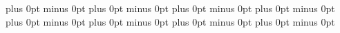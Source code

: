\ITBLayoutChapterTitleAbove=-36pt plus 0pt minus 0pt
\ITBLayoutChapterTitleBelow=18pt plus 0pt minus 0pt
\ITBLayoutSectionTitleAbove=18pt plus 0pt minus 0pt
\ITBLayoutSectionTitleBelow=6pt plus 0pt minus 0pt
\ITBLayoutSubsectionTitleAbove=14pt plus 0pt minus 0pt
\ITBLayoutSubsectionTitleBelow=4pt plus 0pt minus 0pt
\ITBLayoutSubsubsectionTitleAbove=12pt plus 0pt minus 0pt
\ITBLayoutSubsubsectionTitleBelow=4pt plus 0pt minus 0pt

\newcommand{\ITBLayoutCftBeforeChapSkip}{0.2em}
\newcommand{\ITBLayoutCftBeforeSecSkip}{0.1em}
\newcommand{\ITBLayoutCftBeforeSubsecSkip}{0.1em}
\newcommand{\ITBLayoutCftBeforeFigSkip}{0.1em}
\newcommand{\ITBLayoutCftBeforeTabSkip}{0.1em}
\newlength{\ITBLayoutCftBeforeTocTitle}
\newlength{\ITBLayoutCftBeforeLoFTitle}
\newlength{\ITBLayoutCftBeforeLoTTitle}
\newlength{\ITBLayoutCftAfterTocTitle}
\newlength{\ITBLayoutCftAfterLoFTitle}
\newlength{\ITBLayoutCftAfterLoTTitle}

\setlength{\ITBLayoutCftBeforeTocTitle}{-20pt}
\setlength{\ITBLayoutCftBeforeLoFTitle}{-20pt}
\setlength{\ITBLayoutCftBeforeLoTTitle}{-20pt}
\setlength{\ITBLayoutCftAfterTocTitle}{18pt}
\setlength{\ITBLayoutCftAfterLoFTitle}{18pt}
\setlength{\ITBLayoutCftAfterLoTTitle}{18pt}

\newcommand{\ITBApplyTocloftLayout}{%
  \setlength{\cftbeforechapskip}{\ITBLayoutCftBeforeChapSkip}%
  \setlength{\cftbeforesecskip}{\ITBLayoutCftBeforeSecSkip}%
  \setlength{\cftbeforesubsecskip}{\ITBLayoutCftBeforeSubsecSkip}%
  \setlength{\cftbeforefigskip}{\ITBLayoutCftBeforeFigSkip}%
  \setlength{\cftbeforetabskip}{\ITBLayoutCftBeforeTabSkip}%
  \setlength{\cftbeforetoctitleskip}{\ITBLayoutCftBeforeTocTitle}%
  \setlength{\cftbeforeloftitleskip}{\ITBLayoutCftBeforeLoFTitle}%
  \setlength{\cftbeforelottitleskip}{\ITBLayoutCftBeforeLoTTitle}%
  \setlength{\cftaftertoctitleskip}{\ITBLayoutCftAfterTocTitle}%
  \setlength{\cftafterloftitleskip}{\ITBLayoutCftAfterLoFTitle}%
  \setlength{\cftafterlottitleskip}{\ITBLayoutCftAfterLoTTitle}%
}

